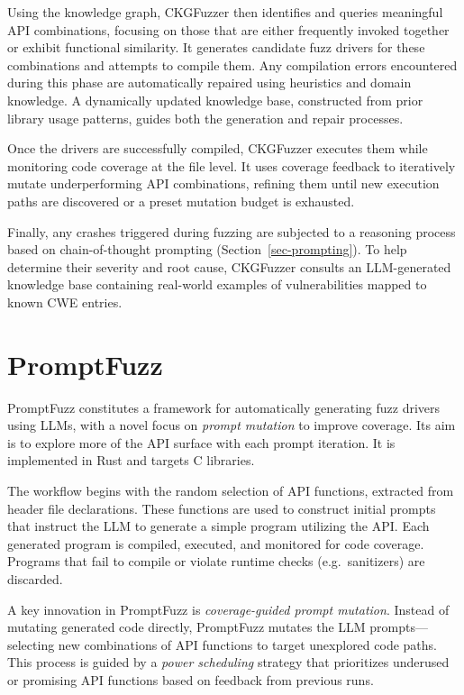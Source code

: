 \documentclass[
  a4paper,
]{scrreprt}
\theoremstyle{definition}
\theoremstyle{remark}
\begin{document}
Using the knowledge graph, CKGFuzzer then identifies and queries
meaningful API combinations, focusing on those that are either
frequently invoked together or exhibit functional similarity. It
generates candidate fuzz drivers for these combinations and attempts to
compile them. Any compilation errors encountered during this phase are
automatically repaired using heuristics and domain knowledge. A
dynamically updated knowledge base, constructed from prior library usage
patterns, guides both the generation and repair processes.

Once the drivers are successfully compiled, CKGFuzzer executes them
while monitoring code coverage at the file level. It uses coverage
feedback to iteratively mutate underperforming API combinations,
refining them until new execution paths are discovered or a preset
mutation budget is exhausted.

Finally, any crashes triggered during fuzzing are subjected to a
reasoning process based on chain-of-thought prompting
(Section~\ref{sec-prompting}). To help determine their severity and root
cause, CKGFuzzer consults an LLM-generated knowledge base containing
real-world examples of vulnerabilities mapped to known CWE entries.

\section{PromptFuzz}\label{promptfuzz}

PromptFuzz \autocite{lyu2024} constitutes a framework for automatically
generating fuzz drivers using LLMs, with a novel focus on \emph{prompt
mutation} to improve coverage. Its aim is to explore more of the API
surface with each prompt iteration. It is implemented in Rust and
targets C libraries.

The workflow begins with the random selection of API functions,
extracted from header file declarations. These functions are used to
construct initial prompts that instruct the LLM to generate a simple
program utilizing the API. Each generated program is compiled, executed,
and monitored for code coverage. Programs that fail to compile or
violate runtime checks (e.g.~sanitizers) are discarded.

A key innovation in PromptFuzz is \emph{coverage-guided prompt
mutation}. Instead of mutating generated code directly, PromptFuzz
mutates the LLM prompts---selecting new combinations of API functions to
target unexplored code paths. This process is guided by a \emph{power
scheduling} strategy that prioritizes underused or promising API
functions based on feedback from previous runs.
\end{document}
